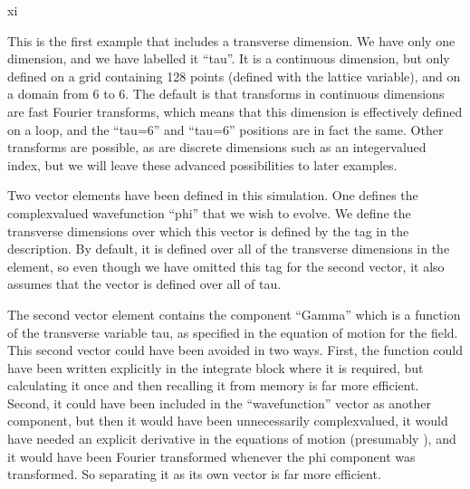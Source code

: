 \documentclass[letterpaper,10pt,english]{sphinxmanual}
\begin{document}
\begin{sphinxVerbatim}[commandchars=\\\{\}]
     xi 
           
\end{sphinxVerbatim}

\sphinxAtStartPar
This is the first example that includes a transverse dimension.  We have only one dimension, and we have labelled it “tau”.  It is a continuous dimension, but only defined on a grid containing 128 points (defined with the lattice variable), and on a domain from \sphinxhyphen{}6 to 6.  The default is that transforms in continuous dimensions are fast Fourier transforms, which means that this dimension is effectively defined on a loop, and the “tau=\sphinxhyphen{}6” and “tau=6” positions are in fact the same.  Other transforms are possible, as are discrete dimensions such as an integer\sphinxhyphen{}valued index, but we will leave these advanced possibilities to later examples.

\sphinxAtStartPar
Two vector elements have been defined in this simulation.  One defines the complex\sphinxhyphen{}valued wavefunction “phi” that we wish to evolve.  We define the transverse dimensions over which this vector is defined by the  tag in the description.  By default, it is defined over all of the transverse dimensions in the  element, so even though we have omitted this tag for the second vector, it also assumes that the vector is defined over all of tau.

\sphinxAtStartPar
The second vector element contains the component “Gamma” which is a function of the transverse variable tau, as specified in the equation of motion for the field.  This second vector could have been avoided in two ways.  First, the function could have been written explicitly in the integrate block where it is required, but calculating it once and then recalling it from memory is far more efficient.  Second, it could have been included in the “wavefunction” vector as another component, but then it would have been unnecessarily complex\sphinxhyphen{}valued, it would have needed an explicit derivative in the equations of motion (presumably ), and it would have been Fourier transformed whenever the phi component was transformed.  So separating it as its own vector is far more efficient.
\end{document}
